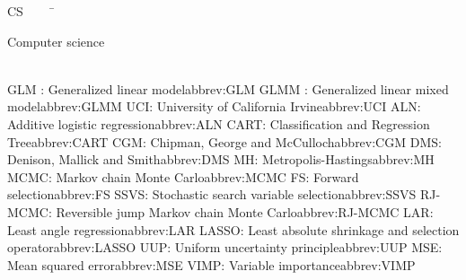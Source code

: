  
 
 
 
 
\begin{tabbing}
CS~~~~~\=\parbox{6in}{\hspace{.4in}Computer science\dotfill \pageref{abbrev:CS}}\\
\addabbrev GLM : {\hspace{.4in}Generalized linear model}{abbrev:GLM}
\addabbrev GLMM : {\hspace{.4in}Generalized linear mixed model}{abbrev:GLMM}
\addabbrev UCI: {\hspace{.4in}University of California Irvine}{abbrev:UCI}
\addabbrev ALN: {\hspace{.4in}Additive logistic regression}{abbrev:ALN}
\addabbrev CART: {\hspace{.4in}Classification and Regression Tree}{abbrev:CART}
\addabbrev CGM: {\hspace{.4in}Chipman, George and McCulloch}{abbrev:CGM}
\addabbrev DMS: {\hspace{.4in}Denison, Mallick and Smith}{abbrev:DMS}
\addabbrev MH: {\hspace{.4in}Metropolis-Hastings}{abbrev:MH}
\addabbrev MCMC: {\hspace{.4in}Markov chain Monte Carlo}{abbrev:MCMC}
\addabbrev FS: {\hspace{.4in}Forward selection}{abbrev:FS}
\addabbrev SSVS: {\hspace{.4in}Stochastic search variable selection}{abbrev:SSVS}
\addabbrev RJ-MCMC: {\hspace{.4in}Reversible jump Markov chain Monte Carlo}{abbrev:RJ-MCMC}
\addabbrev LAR: {\hspace{.4in}Least angle regression}{abbrev:LAR}
\addabbrev LASSO: {\hspace{.4in}Least absolute shrinkage and selection operator}{abbrev:LASSO}
\addabbrev UUP: {\hspace{.4in}Uniform uncertainty principle}{abbrev:UUP}
\addabbrev MSE: {\hspace{.4in}Mean squared error}{abbrev:MSE}
\addabbrev VIMP: {\hspace{.4in}Variable importance}{abbrev:VIMP}

\end{tabbing}
